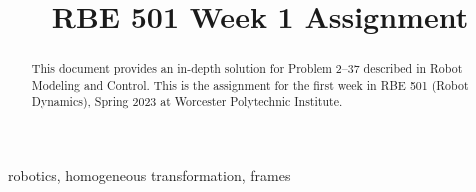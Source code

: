 \documentclass[conference]{IEEEtran}
\begin{document}
\title{RBE 501 Week 1 Assignment}

\author{
}

\maketitle

\begin{abstract}
This document provides an in-depth solution for Problem 2--37 described in
Robot Modeling and Control.
This is the assignment for the first week in RBE 501 (Robot Dynamics),
Spring 2023 at Worcester Polytechnic Institute.
\end{abstract}

\begin{IEEEkeywords}
robotics, homogeneous transformation, frames
\end{IEEEkeywords}
\end{document}
